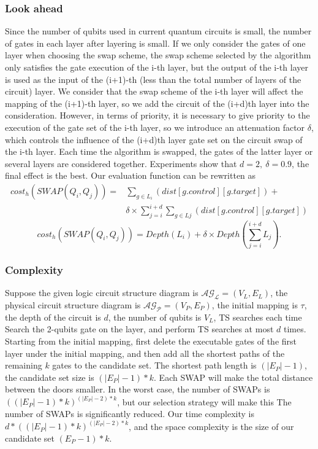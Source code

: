 \documentclass[runningheads]{llncs}
\begin{document}
\subsubsection{Look ahead }
Since the number of qubits used in current quantum circuits is small,
 the number of gates in each layer after layering is small.
If we only consider the gates of one layer when choosing the swap scheme,
the swap scheme selected by the algorithm only satisfies the gate execution
of the i-th layer, 
but the output of the i-th layer is used as the input of the (i+1)-th
(less than the total number of layers of the circuit) layer.
We consider that the swap scheme of the i-th layer will affect the mapping 
of the (i+1)-th layer, so we add the circuit of the (i+d)th  
layer into the consideration.
However, in terms of priority, it is necessary to give priority to the 
execution of the gate set of the i-th layer, 
so we introduce an attenuation factor $\delta$, 
which controls the influence of the (i+d)th layer gate set on the circuit 
swap of the i-th layer.
Each time the algorithm is swapped, 
the gates of the latter layer or several layers are considered together.
Experiments show that $d=2,\ \delta=0.9$, the final effect is the best. 
Our evaluation function can be rewritten as
 \begin{equation}
	 	\begin{aligned}
			cost_{h}(SWAP(Q_{i},Q_{j}))=&\sum_{g \in L_{i}}(dist[g.control][g.target])+\\
	&\delta \times \sum_{j=i}^{i+d}\sum_{g \in L{j}}(dist[g.control][g.target])
	\label{cost_num}
	\end{aligned}
 \end{equation}
	\begin{equation}
		cost_{h}(SWAP(Q_{i},Q_{j}))= Depth(L_{i})+\delta \times Depth(\sum_{j=i}^{i+d}L_{j}).
		\label{cost_depth}
		\end{equation}
\subsubsection{Complexity}
Suppose the given logic circuit structure diagram is 
$\mathcal{AG_{L}}=(V_{L},E_{L})$, 
the physical circuit structure diagram is $\mathcal{AG_{P}}=(V_{P},E_{P})$,
the initial mapping is $\tau$, the depth of the circuit is $d$,
 the number of qubits is $V_{L}$, TS searches each time Search the 2-qubits gate 
 on the layer, and perform TS searches at most $d$ times.
Starting from the initial mapping, 
first delete the executable gates of the first layer under the initial mapping, 
and then add all the shortest paths of the remaining $k$ gates to the candidate set. 
The shortest path length is $(|E_{P}|-1)$, 
the candidate set size  is $(|E_{P}|-1)*k$. 
Each SWAP will make the total distance between the doors smaller. 
In the worst case, the number of SWAPs is $((|E_{P}|-1)*k)^{(|E_{P}|-2)*k}$, 
but our selection strategy will make this The number of SWAPs is significantly 
reduced. Our time complexity is $d*((|E_{P}|-1)*k)^{(|E_{P}|-2)*k}$, 
and the space complexity is the size of our candidate set $(E_{P}-1)*k$.
\end{document}

